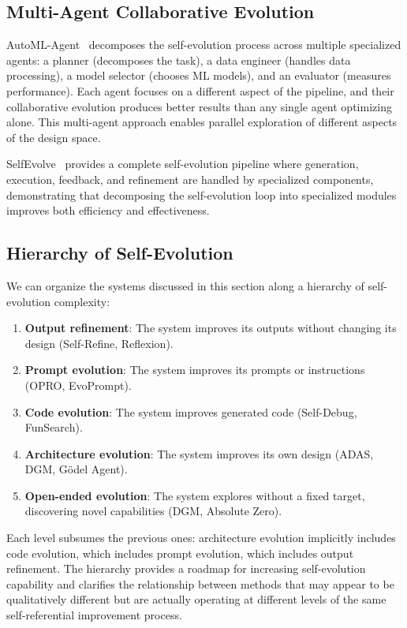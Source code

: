 \documentclass[11pt,a4paper]{article}
\begin{document}
\subsection{Multi-Agent Collaborative Evolution}

AutoML-Agent~\citep{automlagent2024} decomposes the self-evolution process across multiple specialized agents: a planner (decomposes the task), a data engineer (handles data processing), a model selector (chooses ML models), and an evaluator (measures performance). Each agent focuses on a different aspect of the pipeline, and their collaborative evolution produces better results than any single agent optimizing alone. This multi-agent approach enables parallel exploration of different aspects of the design space.

SelfEvolve~\citep{jiang2023selfevolve} provides a complete self-evolution pipeline where generation, execution, feedback, and refinement are handled by specialized components, demonstrating that decomposing the self-evolution loop into specialized modules improves both efficiency and effectiveness.

\subsection{Hierarchy of Self-Evolution}

We can organize the systems discussed in this section along a hierarchy of self-evolution complexity:
\begin{enumerate}
\item \textbf{Output refinement}: The system improves its outputs without changing its design (Self-Refine, Reflexion).
\item \textbf{Prompt evolution}: The system improves its prompts or instructions (OPRO, EvoPrompt).
\item \textbf{Code evolution}: The system improves generated code (Self-Debug, FunSearch).
\item \textbf{Architecture evolution}: The system improves its own design (ADAS, DGM, G\"{o}del Agent).
\item \textbf{Open-ended evolution}: The system explores without a fixed target, discovering novel capabilities (DGM, Absolute Zero).
\end{enumerate}
Each level subsumes the previous ones: architecture evolution implicitly includes code evolution, which includes prompt evolution, which includes output refinement. The hierarchy provides a roadmap for increasing self-evolution capability and clarifies the relationship between methods that may appear to be qualitatively different but are actually operating at different levels of the same self-referential improvement process.
\end{document}
